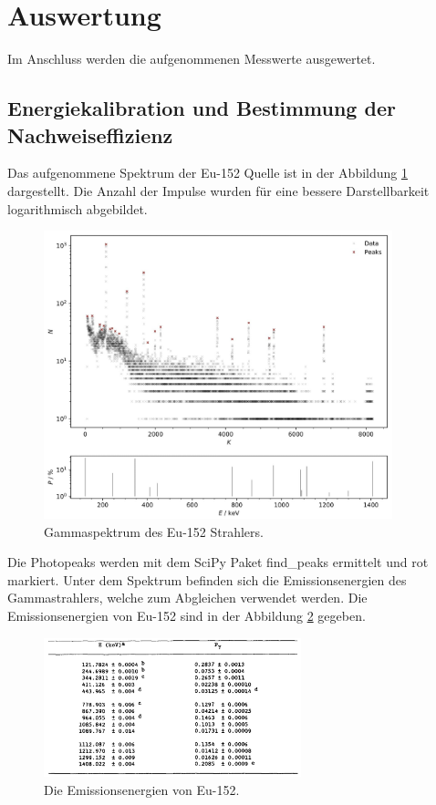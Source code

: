 \section{Auswertung}
\label{sec:auswertung}

Im Anschluss werden die aufgenommenen Messwerte ausgewertet.

\subsection{Energiekalibration und Bestimmung der Nachweiseffizienz}
\label{sec:auswertung1}

Das aufgenommene Spektrum der Eu-152 Quelle ist in der Abbildung \ref{fig:plot1}
dargestellt. Die Anzahl der Impulse wurden für eine bessere Darstellbarkeit logarithmisch abgebildet. 

\begin{figure}[H]
    \centering
    \includegraphics[width=0.9\textwidth]{content/plots/plot1.jpg}
   \caption{Gammaspektrum des Eu-152 Strahlers.}
    \label{fig:plot1}
\end{figure}

Die Photopeaks werden mit dem SciPy Paket find\_peaks ermittelt und rot markiert.
Unter dem Spektrum befinden sich die Emissionsenergien des Gammastrahlers, welche zum Abgleichen verwendet werden.
Die Emissionsenergien von Eu-152 sind in der Abbildung \ref{fig:euE} gegeben.

\begin{figure}[H]
    \centering
    \includegraphics[width=0.666\textwidth]{content/grafik/euenergien.jpg}
    \caption{Die Emissionsenergien von Eu-152. \cite{Kalibration}}
    \label{fig:euE}
\end{figure}

